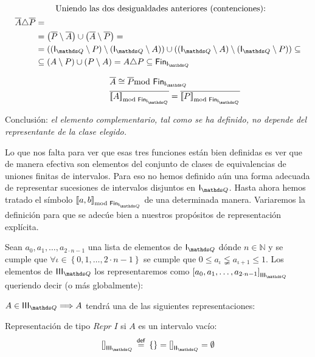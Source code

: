 \documentclass[final,12pt,a4paper,twoside,fleqn]{extbook}
\newcommand{\sthen}{\ensuremath{\Longrightarrow}}
\newcommand{\mathdef}{\ensuremath{\stackrel{\mathsf{def}}{{}={}}}}
\newcommand{\then}{\ensuremath{\sthen}}
\newcommand{\set}[1]{\ensuremath{\left\lbrace{#1}\right\rbrace}}
\newcommand{\setN}{\ensuremath{\mathds{N}}}
\theoremstyle{definition}
\theoremstyle{remark}
\begin{document}
\begin{align}
&\qquad \text{ Uniendo las dos desigualdades anteriores (contenciones):} \\
\overline{A}\triangle\overline{P} &= \\
\qquad &= \left( \overline{P} \setminus \overline{A} \right) \cup \left(
\overline{A} \setminus \overline{P} \right) = \\
\qquad &= \left( \left( \IQ \setminus P \right) \setminus \left( \IQ
\setminus A \right) \right) \cup \left( \left( \IQ \setminus A \right)
\setminus \left( \IQ \setminus P \right) \right) \subseteq \\
\qquad &\subseteq \left( A \setminus P \right) \cup \left( P \setminus A
\right) = A \triangle P \subseteq \FinIQ
\end{align}

\begin{align}
&\qquad\qquad \overline{A} \cong \overline{P} \FinDiffRel \\
&\qquad\qquad \overline{ \ClEqFinDiff{ A } } = \overline{ \ClEqFinDiff{ P } }
\end{align}


	Conclusión: \emph{el elemento complementario, tal como se ha definido, no depende del representante de la clase elegido.}




	Lo que nos falta para ver que esas tres funciones están bien definidas es
ver que de manera efectiva son elementos del conjunto de clases de
equivalencias de uniones finitas de intervalos. Para eso no hemos definido
aún una forma adecuada de representar sucesiones de intervalos disjuntos en
\(\IQ\). Hasta ahora hemos tratado el símbolo \(\ClEqFinDiff{a,b}\) de una
determinada manera. Variaremos la definición para que se adecúe bien a
nuestros propósitos de representación explícita.



	Sean \(a_0,a_1,\ldots,a_{2\cdot n-1}\) una lista de elementos de \(\IQ\)
dónde \(n\in\setN\) y se cumple que \(\forall \iota \in
\set{0,1,\ldots,2\cdot n-1}\) se cumple que \( 0 \leq a_{\iota} \lneqq
a_{\iota+1} \leq 1 \). Los elementos de \(\IIIQ\) los representaremos como
\(\left[{a_0, a_1, \ldots , a_{2\cdot n - 1}}\right]_{\IIIQ}\) queriendo
decir (o más globalmente):



\(A\in\IIIQ \then A\) tendrá una de las siguientes representaciones:



Representación de tipo \(Repr\;I\) si \(A\) es un intervalo vacío:
\begin{equation}
\left[{}\right]_{\IIIQ} \mathdef \set{} = {\left[{}\right]}_{\IIQ} =
\emptyset
\end{equation}
\end{document}
